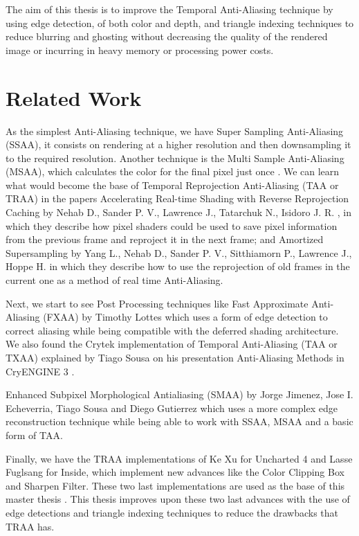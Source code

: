 \documentclass{cslthse-msc}
\begin{document}
The aim of this thesis is to improve the Temporal Anti-Aliasing technique by using edge detection, of both color and depth, and triangle indexing techniques to reduce blurring and ghosting without decreasing the quality of the rendered image or incurring in heavy memory or processing power costs.  


\section{Related Work}
As the simplest Anti-Aliasing technique, we have Super Sampling Anti-Aliasing (SSAA), it consists on rendering at a higher resolution and then downsampling it to the required resolution. Another technique is the Multi Sample Anti-Aliasing (MSAA), which calculates the color for the final pixel just once \cite{Doggett2017EDAN35}.  We can learn what would become the base of Temporal Reprojection Anti-Aliasing (TAA or TRAA) in the papers Accelerating Real-time Shading with Reverse Reprojection Caching  by Nehab D., Sander P. V., Lawrence J., Tatarchuk N., Isidoro J. R. \cite{Nehab2007}, in which they describe how pixel shaders could be used to save pixel information from the previous frame and reproject it in the next frame; and Amortized Supersampling by Yang L., Nehab D., Sander P. V., Sitthiamorn P., Lawrence J., Hoppe H. \cite{Yang2009} in which they describe how to use the reprojection of old frames in the current one as a method of real time Anti-Aliasing.

Next, we start to see Post Processing techniques like Fast Approximate Anti-Aliasing (FXAA) by Timothy Lottes \cite{Lottes2009} which uses a form of edge detection to correct aliasing while being compatible with the deferred shading architecture. We also found the Crytek implementation of Temporal Anti-Aliasing (TAA or TXAA) explained by Tiago Sousa on his presentation Anti-Aliasing Methods in CryENGINE 3 \cite{JIMENEZ2011_SIGGRAPH11}.

Enhanced Subpixel Morphological Antialiasing (SMAA) by Jorge Jimenez, Jose I. Echeverria, Tiago Sousa and Diego Gutierrez \cite{Jimenez2012} which uses a more complex edge reconstruction technique while being able to work with SSAA, MSAA and a basic form of TAA.
 
Finally, we have the TRAA implementations of Ke Xu for Uncharted 4 and Lasse Fuglsang for Inside, which implement new advances like the Color Clipping Box and Sharpen Filter. These two last implementations are used as the base of this master thesis \cite{Fuglsand2016, XU2016}. This thesis improves upon these two last advances with the use of edge detections and triangle indexing techniques to reduce the drawbacks that TRAA has.
\end{document}
